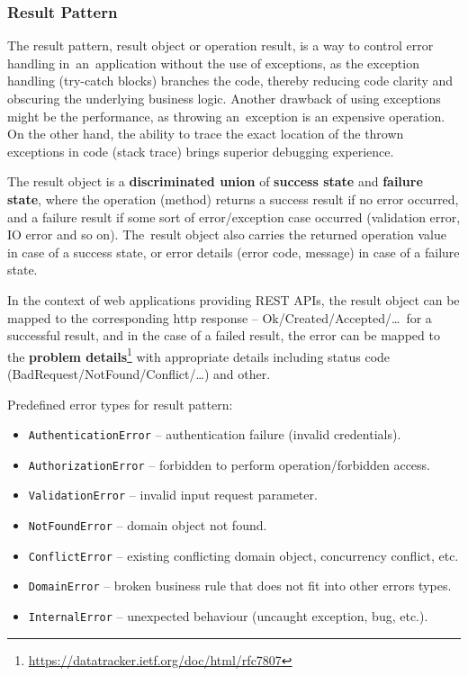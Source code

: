 \subsubsection{Result Pattern}
The result pattern, result object or operation result, is a way to control error handling in~an~application without the use of exceptions, as the exception handling (try-catch blocks) branches the code, thereby reducing code clarity and obscuring the underlying business logic. Another drawback of using exceptions might be the performance, as throwing an~exception is an expensive operation. On the other hand, the ability to trace the exact location of the thrown exceptions in code (stack trace) brings superior debugging experience.

The result object is a \textbf{discriminated union} of \textbf{success state} and \textbf{failure state}, where the operation (method) returns a success result if no error occurred, and a failure result if some sort of error/exception case occurred (validation error, IO error and so on). The~result object also carries the returned operation value in case of a success state, or error details (error code, message) in case of a failure state.

In the context of web applications providing REST APIs, the result object can be mapped to the corresponding http response -- Ok/Created/Accepted/\dots~for a successful result, and in the case of a failed result, the error can be mapped to the \textbf{problem details}\footnote{\url{https://datatracker.ietf.org/doc/html/rfc7807}} with appropriate details including status code (BadRequest/NotFound/Conflict/\dots) and other.

Predefined error types for result pattern:
\begin{itemize}
    \item \texttt{AuthenticationError} -- authentication failure (invalid credentials).
    \item \texttt{AuthorizationError} -- forbidden to perform operation/forbidden access.
    \item \texttt{ValidationError} -- invalid input request parameter.
    \item \texttt{NotFoundError} -- domain object not found.
    \item \texttt{ConflictError} -- existing conflicting domain object, concurrency conflict, etc.
    \item \texttt{DomainError} -- broken business rule that does not fit into other errors types.
    \item \texttt{InternalError} -- unexpected behaviour (uncaught exception, bug, etc.). 
\end{itemize}

